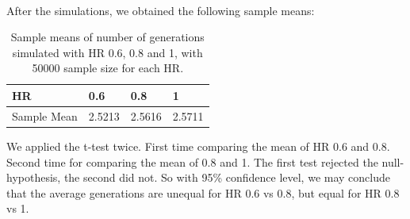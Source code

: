 \\
After the simulations, we obtained the following sample means:
\begin{table}[htp]
\centering
\caption{Sample means of number of generations simulated with HR 0.6, 0.8 and 1, with 50000 sample size for each HR.}
\begin{tabular}{|l|l|l|l|}
\hline
 HR&0.6&0.8&1 \\ \hline
 Sample Mean&2.5213&2.5616&2.5711  \\ \hline 
\end{tabular}
\end{table}
We applied the t-test twice. First time comparing the mean of HR 0.6 and 0.8. Second time for comparing the mean of 0.8 and 1. The first test rejected the null-hypothesis, the second did not. So with 95\% confidence level, we may conclude that the average generations are unequal for HR 0.6 vs 0.8, but equal for HR 0.8 vs 1.




